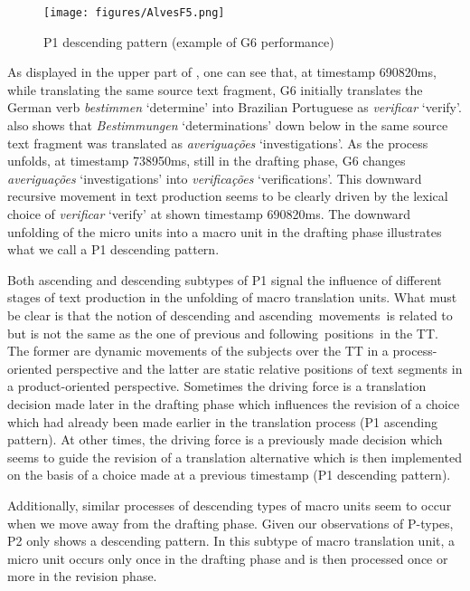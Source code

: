\documentclass[output=paper]{LSP/langsci}
\begin{document}
\begin{figure}
\texttt{[image: figures/AlvesF5.png]}
\caption{P1 descending pattern (example of G6 performance)}
\label{fig:alves:5}
\end{figure} 

As displayed in the upper part of , one can see that, at timestamp 690820ms, while translating the same source text fragment, G6 initially translates the German verb \textit{bestimmen} `determine' into Brazilian Portuguese as \textit{verificar} `verify'.  also shows that \textit{Bestimmungen} `determinations' down below in the same source text fragment was translated as \textit{averiguações} `investigations'. As the process unfolds, at timestamp 738950ms, still in the drafting phase, G6 changes \textit{averiguações} `investigations' into \textit{verificações} `verifications'. This downward recursive movement in text production seems to be clearly driven by the lexical choice of  \textit{verificar} `verify' at shown timestamp 690820ms. The downward unfolding of the micro units into a macro unit in the drafting phase illustrates what we call a P1 descending pattern.

Both ascending and descending subtypes of P1 signal the influence of different stages of text production in the unfolding of macro translation units. What must be clear is that the notion of descending and ascending~movements~is related to but is not the same as the one of previous and following~positions~in the TT. The former are dynamic movements of the subjects over the TT in a process-oriented perspective and the latter are static relative positions of text segments in a product-oriented perspective. Sometimes the driving force is a translation decision made later in the drafting phase which influences the revision of a choice which had already been made earlier in the translation process (P1 ascending pattern). At other times, the driving force is a previously made decision which seems to guide the revision of a translation alternative which is then implemented on the basis of a choice made at a previous timestamp (P1 descending pattern).

Additionally, similar processes of descending types of macro units seem to occur when we move away from the drafting phase. Given our observations of P-types, P2 only shows a descending pattern. In this subtype of macro translation unit, a micro unit occurs only once in the drafting phase and is then processed once or more in the revision phase.
\end{document}
